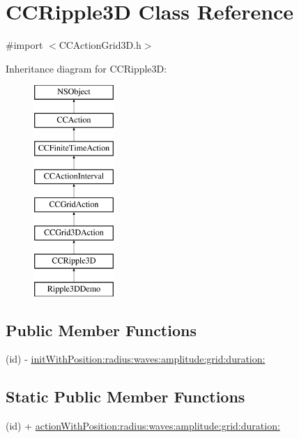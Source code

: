 \hypertarget{interface_c_c_ripple3_d}{\section{C\-C\-Ripple3\-D Class Reference}
\label{interface_c_c_ripple3_d}
}


{\ttfamily \#import $<$C\-C\-Action\-Grid3\-D.\-h$>$}

Inheritance diagram for C\-C\-Ripple3\-D\-:\begin{figure}[H]
\begin{center}
\leavevmode
\includegraphics[height=8.000000cm]{interface_c_c_ripple3_d}
\end{center}
\end{figure}
\subsection*{Public Member Functions}
\begin{DoxyCompactItemize}
\item 
(id) -\/ \hyperlink{interface_c_c_ripple3_d_a60b2bea3f2ca96ca6b224a7dad77d31a}{init\-With\-Position\-:radius\-:waves\-:amplitude\-:grid\-:duration\-:}
\end{DoxyCompactItemize}
\subsection*{Static Public Member Functions}
\begin{DoxyCompactItemize}
\item 
(id) + \hyperlink{interface_c_c_ripple3_d_ad7be722ec5108eebefcacf7c46839811}{action\-With\-Position\-:radius\-:waves\-:amplitude\-:grid\-:duration\-:}
\end{DoxyCompactItemize}
